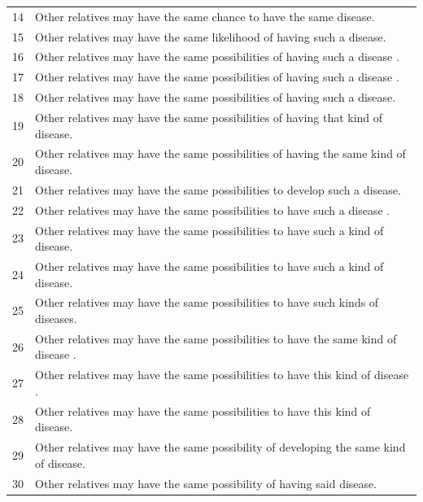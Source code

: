 \documentclass[letterpaper, 11pt]{article}
\begin{document}
\begin{table}[]
\begin{tabular}{ll}
		14                           & Other relatives may have the same chance to have the same disease.                    \\
		15                           & Other relatives may have the same likelihood of having such a disease.                \\
		16                           & Other relatives may have the same possibilities of having such a disease .            \\
		17                           & Other relatives may have the same possibilities of having such a disease .            \\
		18                           & Other relatives may have the same possibilities of having such a disease.             \\
		19                           & Other relatives may have the same possibilities of having that kind of disease.       \\
		20                           & Other relatives may have the same possibilities of having the same kind of disease.   \\
		21                           & Other relatives may have the same possibilities to develop such a disease.            \\
		22                           & Other relatives may have the same possibilities to have such a disease .              \\
		23                           & Other relatives may have the same possibilities to have such a kind of disease.       \\
		24                           & Other relatives may have the same possibilities to have such a kind of disease.       \\
		25                           & Other relatives may have the same possibilities to have such kinds of diseases.       \\
		26                           & Other relatives may have the same possibilities to have the same kind of disease .    \\
		27                           & Other relatives may have the same possibilities to have this kind of disease .        \\
		28                           & Other relatives may have the same possibilities to have this kind of disease.         \\
		29                           & Other relatives may have the same possibility of developing the same kind of disease. \\
		30                           & Other relatives may have the same possibility of having said disease.                 \\

\end{tabular}
\end{table}
\end{document}
